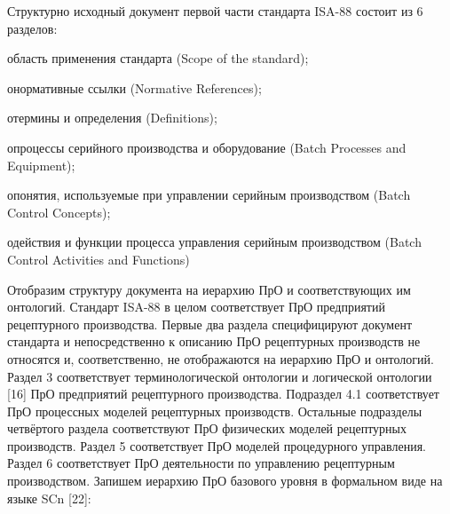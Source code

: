 Структурно исходный документ первой части стандарта ISA-88 состоит из 6 разделов:
\begin{textitemize}
    \item область применения стандарта (Scope of the standard);
    \item онормативные ссылки (Normative References);
    \item отермины и определения (Definitions);
    \item опроцессы серийного производства и оборудование (Batch Processes and Equipment);
    \item опонятия, используемые при управлении серийным производством (Batch Control Concepts);
    \item одействия и функции процесса управления серийным производством (Batch Control Activities and Functions)
\end{textitemize}

Отобразим структуру документа на иерархию ПрО и соответствующих им онтологий. Стандарт ISA-88 в целом соответствует ПрО предприятий рецептурного производства. Первые два раздела специфицируют документ стандарта и непосредственно к описанию ПрО рецептурных производств не относятся и, соответственно, не отображаются на иерархию ПрО и онтологий. Раздел 3 соответствует терминологической онтологии и логической онтологии [16] ПрО предприятий рецептурного производства. Подраздел 4.1 соответствует ПрО процессных моделей рецептурных производств. Остальные подразделы четвёртого раздела соответствуют ПрО физических моделей рецептурных производств. Раздел 5 соответствует ПрО моделей процедурного управления. Раздел 6 соответствует ПрО деятельности по управлению рецептурным производством.
Запишем иерархию ПрО базового уровня в формальном виде на языке SCn [22]:

\begin{SCn}
\end{SCn}



